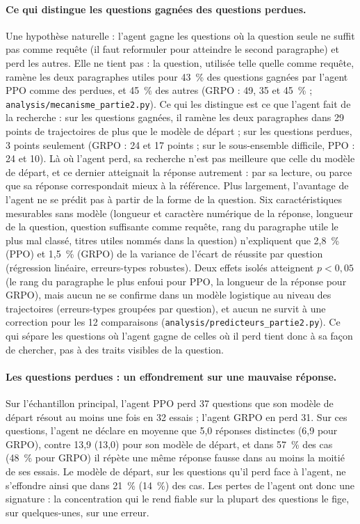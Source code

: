 \paragraph{Ce qui distingue les questions gagnées des questions perdues.} Une hypothèse naturelle : l'agent gagne les questions où la question seule ne suffit pas comme requête (il faut reformuler pour atteindre le second paragraphe) et perd les autres. Elle ne tient pas : la question, utilisée telle quelle comme requête, ramène les deux paragraphes utiles pour 43~\% des questions gagnées par l'agent PPO comme des perdues, et 45~\% des autres (GRPO : 49, 35 et 45~\% ; \texttt{analysis/mecanisme\_partie2.py}). Ce qui les distingue est ce que l'agent fait de la recherche : sur les questions gagnées, il ramène les deux paragraphes dans 29 points de trajectoires de plus que le modèle de départ ; sur les questions perdues, 3 points seulement (GRPO : 24 et 17 points ; sur le sous-ensemble difficile, PPO : 24 et 10). Là où l'agent perd, sa recherche n'est pas meilleure que celle du modèle de départ, et ce dernier atteignait la réponse autrement : par sa lecture, ou parce que sa réponse correspondait mieux à la référence. Plus largement, l'avantage de l'agent ne se prédit pas à partir de la forme de la question. Six caractéristiques mesurables sans modèle (longueur et caractère numérique de la réponse, longueur de la question, question suffisante comme requête, rang du paragraphe utile le plus mal classé, titres utiles nommés dans la question) n'expliquent que 2,8~\% (PPO) et 1,5~\% (GRPO) de la variance de l'écart de réussite par question (régression linéaire, erreurs-types robustes). Deux effets isolés atteignent $p < 0{,}05$ (le rang du paragraphe le plus enfoui pour PPO, la longueur de la réponse pour GRPO), mais aucun ne se confirme dans un modèle logistique au niveau des trajectoires (erreurs-types groupées par question), et aucun ne survit à une correction pour les 12 comparaisons (\texttt{analysis/predicteurs\_partie2.py}). Ce qui sépare les questions où l'agent gagne de celles où il perd tient donc à sa façon de chercher, pas à des traits visibles de la question.

\paragraph{Les questions perdues : un effondrement sur une mauvaise réponse.} Sur l'échantillon principal, l'agent PPO perd 37 questions que son modèle de départ résout au moins une fois en 32 essais ; l'agent GRPO en perd 31. Sur ces questions, l'agent ne déclare en moyenne que 5,0 réponses distinctes (6,9 pour GRPO), contre 13,9 (13,0) pour son modèle de départ, et dans 57~\% des cas (48~\% pour GRPO) il répète une même réponse fausse dans au moins la moitié de ses essais. Le modèle de départ, sur les questions qu'il perd face à l'agent, ne s'effondre ainsi que dans 21~\% (14~\%) des cas. Les pertes de l'agent ont donc une signature : la concentration qui le rend fiable sur la plupart des questions le fige, sur quelques-unes, sur une erreur.

